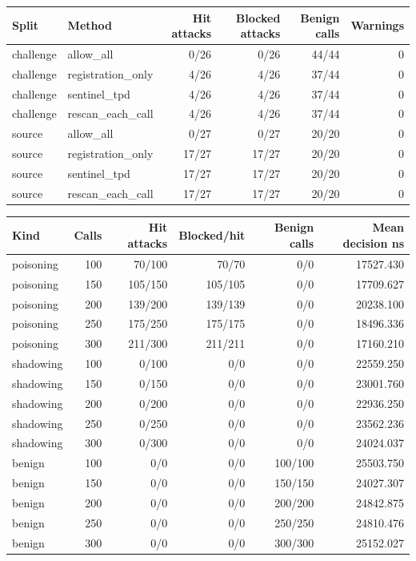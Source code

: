 \begin{tabular}{llrrrr}
Split & Method & Hit attacks & Blocked attacks & Benign calls & Warnings \\
\hline
challenge & allow\_all & 0/26 & 0/26 & 44/44 & 0 \\
challenge & registration\_only & 4/26 & 4/26 & 37/44 & 0 \\
challenge & sentinel\_tpd & 4/26 & 4/26 & 37/44 & 0 \\
challenge & rescan\_each\_call & 4/26 & 4/26 & 37/44 & 0 \\
source & allow\_all & 0/27 & 0/27 & 20/20 & 0 \\
source & registration\_only & 17/27 & 17/27 & 20/20 & 0 \\
source & sentinel\_tpd & 17/27 & 17/27 & 20/20 & 0 \\
source & rescan\_each\_call & 17/27 & 17/27 & 20/20 & 0 \\
\end{tabular}

\begin{tabular}{lrrrrr}
Kind & Calls & Hit attacks & Blocked/hit & Benign calls & Mean decision ns \\
\hline
poisoning & 100 & 70/100 & 70/70 & 0/0 & 17527.430 \\
poisoning & 150 & 105/150 & 105/105 & 0/0 & 17709.627 \\
poisoning & 200 & 139/200 & 139/139 & 0/0 & 20238.100 \\
poisoning & 250 & 175/250 & 175/175 & 0/0 & 18496.336 \\
poisoning & 300 & 211/300 & 211/211 & 0/0 & 17160.210 \\
shadowing & 100 & 0/100 & 0/0 & 0/0 & 22559.250 \\
shadowing & 150 & 0/150 & 0/0 & 0/0 & 23001.760 \\
shadowing & 200 & 0/200 & 0/0 & 0/0 & 22936.250 \\
shadowing & 250 & 0/250 & 0/0 & 0/0 & 23562.236 \\
shadowing & 300 & 0/300 & 0/0 & 0/0 & 24024.037 \\
benign & 100 & 0/0 & 0/0 & 100/100 & 25503.750 \\
benign & 150 & 0/0 & 0/0 & 150/150 & 24027.307 \\
benign & 200 & 0/0 & 0/0 & 200/200 & 24842.875 \\
benign & 250 & 0/0 & 0/0 & 250/250 & 24810.476 \\
benign & 300 & 0/0 & 0/0 & 300/300 & 25152.027 \\
\end{tabular}

